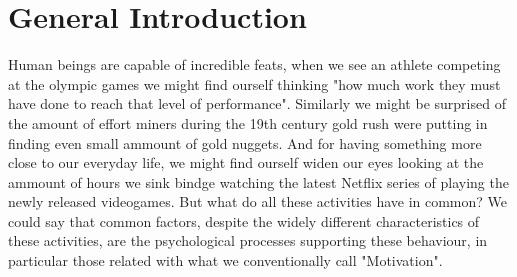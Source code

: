 \section{General Introduction}
Human beings are capable of incredible feats, when we see an athlete competing at the olympic games we might find ourself thinking "how much work they must have done to reach that level of performance". Similarly we might be surprised of the amount of effort miners during the 19th century gold rush were putting in finding even small ammount of gold nuggets. And for having something more close to our everyday life, we might find ourself widen our eyes looking at the ammount of hours we sink bindge watching the latest Netflix series of playing the newly released videogames. But what do all these activities have in common? We could say that common factors, despite the widely different characteristics of these activities, are the psychological processes supporting these behaviour, in particular those related with what we conventionally call "Motivation".

